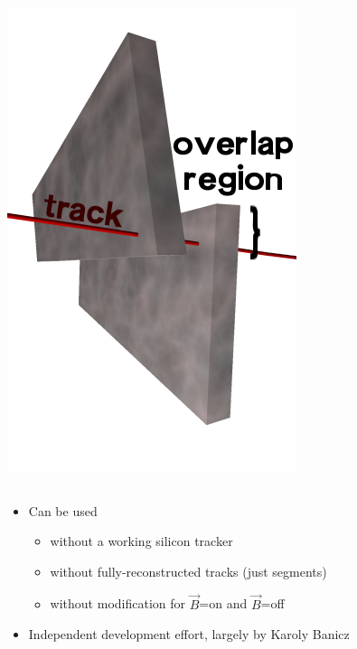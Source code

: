 \documentclass[compress]{beamer}
\begin{document}
\begin{frame}
\begin{columns}
\includegraphics[width=\linewidth]{overlap.png}
\end{columns}

\begin{itemize}\setlength{\itemsep}{0.2 cm}
\item Can be used
\begin{itemize}
\item without a working silicon tracker
\item without fully-reconstructed tracks (just segments)
\item without modification for $\vec{B}$=on and $\vec{B}$=off
\end{itemize}
\item Independent development effort, largely by Karoly Banicz
\end{itemize}
\end{frame}
\end{document}
